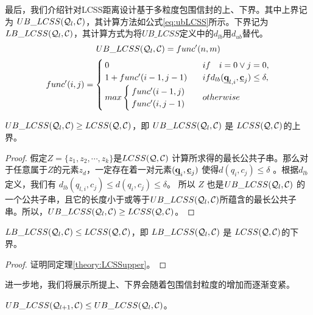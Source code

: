 最后，我们介绍针对LCSS距离设计基于多粒度包围信封的上、下界。其中上界记为 $UB\_LCSS({\cal Q}_{l}, {\cal C})$，其计算方法如公式\ref{eq:ubLCSS}所示。下界记为$LB\_LCSS({\cal Q}_{l}, {\cal C})$，其计算方式为将$UB\_LCSS$定义中的$ d_{lb}$用$ d_{ub}$替代。
\begin{equation}\label{eq:ubLCSS}
UB\_LCSS({\cal Q}_{l},{\cal C})= func'(n, m)
\end{equation}
\begin{equation*}	
func'(i,j)=
\begin{cases}
0  & if \quad i=0 \lor j=0,\\ 
1 + func'(i-1, j-1) & if  d_{lb}(\emph{{\textbf{q}}}_{l,i}, \emph{{\textbf{c}}}_{j}) \le \delta, \\
max 
\begin{cases}
func'(i-1,j)\\
func'(i,j-1)
\end{cases} & otherwise
\end{cases}
\end{equation*}
	\begin{theorem}\label{theory:LCSSupper}$UB\_LCSS({\cal Q}_{l}, {\cal C}) \ge 	LCSS({\cal Q},{\cal C})$，即
	$UB\_LCSS({\cal Q}_{l}, {\cal C})$	是 $LCSS({\cal Q},{\cal C})$的上界。
\end{theorem}  
\begin{proof}\label{proof:LCSSUPPER}
	假定$Z=\{ z_{1}, z_{2}, \cdots, z_{k}\}$是$LCSS({\cal Q},{\cal C})$ 计算所求得的最长公共子串。那么对于任意属于$Z$的元素$z_{d}$，一定存在着一对元素$(\emph{{\textbf{q}}}_{i}, \emph{{\textbf{c}}}_{j})$ 
	使得$d(q_{i}, c_{j}) \le \delta$ 。根据$d_{lb}$定义，我们有 $d_{lb}(q_{l,i}, c_{j}) \le d(q_{i}, c_{j}) \le \delta$。 所以 $Z$ 也是$UB\_LCSS({\cal Q}_{l},{\cal C})$ 的一个公共子串，且它的长度小于或等于$UB\_LCSS({\cal Q}_{l}, {\cal C})$所蕴含的最长公共子串。所以，$UB\_LCSS({\cal Q}_{l}, {\cal C})\ge LCSS({\cal Q},{\cal C})$。
\end{proof}

	\begin{theorem}\label{theory:LCSSlower}$LB\_LCSS({\cal Q}_{l}, {\cal C}) \le 	LCSS({\cal Q},{\cal C})$，即
	$LB\_LCSS({\cal Q}_{l}, {\cal C})$	是 $LCSS({\cal Q},{\cal C})$的下界。
\end{theorem}  
\begin{proof}
证明同定理\ref{theory:LCSSupper}。
\end{proof}
进一步地，我们将展示所提上、下界会随着包围信封粒度的增加而逐渐变紧。
\begin{theorem}\label{theory:LCSSupperDecrease}
	$UB\_LCSS({\cal Q}_{l+1}, {\cal C}) \le UB\_LCSS({\cal Q}_{l}, {\cal C}) $。
\end{theorem}  

